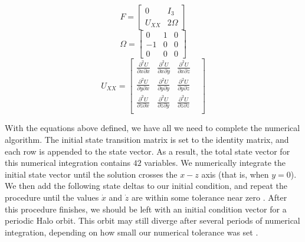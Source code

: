\documentclass[conf]{new-aiaa}
\begin{document}
\begin{multicols}{2}
\begin{equation}
    F = \begin{bmatrix} 0 & I_3 \\ U_{XX} & 2\Omega \end{bmatrix}
\end{equation}
\begin{equation}
    \Omega = \begin{bmatrix} 0 & 1 & 0 \\ -1 & 0 & 0 \\ 0 & 0 & 0  \end{bmatrix}
\end{equation}
\begin{equation}
    U_{XX} = \begin{bmatrix} 
        \frac{\partial^2 U}{\partial x \partial x} & 
        \frac{\partial^2 U}{\partial x \partial y} & 
        \frac{\partial^2 U}{\partial x \partial z} & \\
        \frac{\partial^2 U}{\partial y \partial x} & 
        \frac{\partial^2 U}{\partial y \partial y} & 
        \frac{\partial^2 U}{\partial y \partial z} & \\
        \frac{\partial^2 U}{\partial z \partial x} & 
        \frac{\partial^2 U}{\partial z \partial y} & 
        \frac{\partial^2 U}{\partial z \partial z} & \\
    \end{bmatrix}
\end{equation}

With the equations above defined, we have all we need to complete the numerical algorithm.
The initial state transition matrix is set to the identity matrix, and each row is appended 
to the state vector. As a result, the total state vector for this numerical integration 
contains $42$ variables. We numerically integrate the initial state vector until 
the solution crosses the $x-z$ axis (that is, when $y = 0$). We then add the following 
state deltas to our initial condition, and repeat the procedure until the values $\dot{x}$ and 
$\dot{z}$ are within some tolerance near zero \cite{rund2018interplanetary}. After this 
procedure finishes, we should be left with an initial condition vector for a periodic Halo orbit.
This orbit may still diverge after several periods of numerical integration, depending on 
how small our numerical tolerance was set \cite{rund2018interplanetary}.


\end{multicols}
\end{document}
